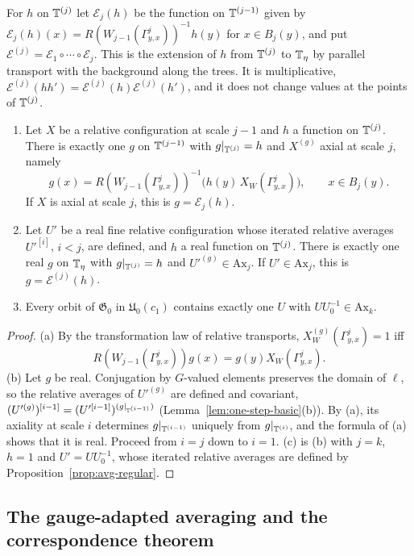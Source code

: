 For $h$ on $\mathbb T^{(j)}$ let $\mathcal E_j(h)$ be the function on $\mathbb T^{(j-1)}$ given by $\mathcal E_j(h)(x)=R(W_{j-1}(\Gamma^j_{y,x}))^{-1}h(y)$ for $x\in B_j(y)$, and put $\mathcal E^{(j)}=\mathcal E_1\circ\cdots\circ\mathcal E_j$. This is the extension of $h$ from $\mathbb T^{(j)}$ to $\mathbb T_\eta$ by parallel transport with the background along the trees. It is multiplicative, $\mathcal E^{(j)}(hh')=\mathcal E^{(j)}(h)\mathcal E^{(j)}(h')$, and it does not change values at the points of $\mathbb T^{(j)}$.

\begin{lemma}\label{lem:axial}
\begin{enumerate}[label=(\alph*)]
\item Let $X$ be a relative configuration at scale $j-1$ and $h$ a function on $\mathbb T^{(j)}$. There is exactly one $g$ on $\mathbb T^{(j-1)}$ with $g|_{\mathbb T^{(j)}}=h$ and $X^{(g)}$ axial at scale $j$, namely
\[
g(x)=R(W_{j-1}(\Gamma^j_{y,x}))^{-1}\big(h(y)\,X_W(\Gamma^j_{y,x})\big),\qquad x\in B_j(y).
\]
If $X$ is axial at scale $j$, this is $g=\mathcal E_j(h)$.
\item Let $U'$ be a real fine relative configuration whose iterated relative averages $U'^{[i]}$, $i<j$, are defined, and $h$ a real function on $\mathbb T^{(j)}$. There is exactly one real $g$ on $\mathbb T_\eta$ with $g|_{\mathbb T^{(j)}}=h$ and $U'^{(g)}\in\mathrm{Ax}_j$. If $U'\in\mathrm{Ax}_j$, this is $g=\mathcal E^{(j)}(h)$.
\item Every orbit of $\mathfrak G_0$ in $\mathfrak U_0(c_1)$ contains exactly one $U$ with $UU_0^{-1}\in\mathrm{Ax}_k$.
\end{enumerate}
\end{lemma}

\begin{proof}
(a) By the transformation law of relative transports, $X^{(g)}_W(\Gamma^j_{y,x})=1$ iff
\[
R(W_{j-1}(\Gamma^j_{y,x}))g(x)=g(y)X_W(\Gamma^j_{y,x}).
\] (b) Let $g$ be real. Conjugation by $G$-valued elements preserves the domain of $\ell$, so the relative averages of $U'^{(g)}$ are defined and covariant, $(U'^{(g)})^{[i-1]}=(U'^{[i-1]})^{(g|_{\mathbb T^{(i-1)}})}$ (Lemma~\ref{lem:one-step-basic}(b)). By (a), its axiality at scale $i$ determines $g|_{\mathbb T^{(i-1)}}$ uniquely from $g|_{\mathbb T^{(i)}}$, and the formula of (a) shows that it is real. Proceed from $i=j$ down to $i=1$. (c) is (b) with $j=k$, $h=1$ and $U'=UU_0^{-1}$, whose iterated relative averages are defined by Proposition~\ref{prop:avg-regular}.
\end{proof}

\subsection{The gauge-adapted averaging and the correspondence theorem}

